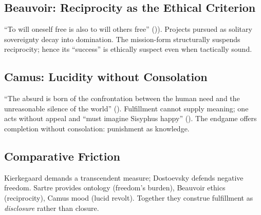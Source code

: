 \subsection*{Beauvoir: Reciprocity as the Ethical Criterion}
\label{ssec:beauvoir-reciprocity-as-the-ethical-criterion}
“To will oneself free is also to will others free” (\parencite[p.~73]{Beauvoir1976})). Projects pursued as solitary sovereignty decay into domination. The mission-form structurally suspends reciprocity; hence its “success” is ethically suspect even when tactically sound.

\subsection*{Camus: Lucidity without Consolation}
\label{ssec:camus-lucidity-without-consolation}
“The absurd is born of the confrontation between the human need and the unreasonable silence of the world” (\parencite[p.~28]{CamusMyth1991}). Fulfillment cannot supply meaning; one acts without appeal and “must imagine Sisyphus happy” (\parencite[p.~123]{CamusMyth1991}). The endgame offers completion without consolation: punishment as knowledge.

\subsection*{Comparative Friction}
\label{ssec:comparative-friction-existential}
Kierkegaard demands a transcendent measure; Dostoevsky defends negative freedom. Sartre provides ontology (freedom’s burden), Beauvoir ethics (reciprocity), Camus mood (lucid revolt). Together they construe fulfillment as \emph{disclosure} rather than closure.

